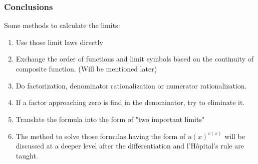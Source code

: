 

\begin{frame}
	\frametitle{Conclusions}
	Some methods to calculate the limits:
	\begin{enumerate}
		\item Use those limit laws directly
		\item Exchange the order of functions and limit symbols based on the continuity of composite function. (Will be mentioned later)
		\item Do factorization, denominator rationalization or numerator rationalization.
		\item If a factor approaching zero is find in the denominator, try to eliminate it.
		\item Translate the formula into the form of "two important limits"
		\item \alert{The method to solve those formulas having the form of $u(x)^{v(x)}$ will be discussed at a deeper level after the differentiation and l'Hôpital's rule are taught.}
	\end{enumerate}
\end{frame}






